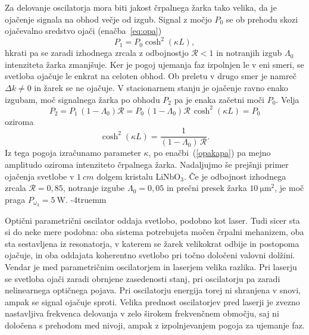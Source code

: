 Za delovanje oscilatorja mora biti jakost črpalnega žarka tako velika, da je 
ojačenje signala na obhod večje od izgub. Signal z močjo 
$P_0$ se ob prehodu skozi ojačevalno sredstvo ojači (enačba~\ref{eq:opa})
\begin{equation}
P_1 = P_0 \cosh^2 (\kappa L),
\end{equation}
hkrati pa se zaradi izhodnega zrcala z odbojnostjo $\mathcal{R}<1$ in notranjih izgub $\Lambda_0$ 
intenziteta žarka zmanjšuje. Ker je pogoj ujemanja faz izpolnjen le v eni smeri, se svetloba
ojačuje le enkrat na celoten obhod. Ob preletu v drugo smer je namreč $\Delta k \neq 0$ in 
žarek se ne ojačuje. V stacionarnem stanju je ojačenje ravno enako izgubam, moč 
signalnega žarka po obhodu $P_2$ pa je enaka začetni moči $P_0$. Velja
\begin{equation}
P_2 = P_1\,(1-\Lambda_0)\mathcal{R} = P_0 \,(1-\Lambda_0) \mathcal{R} \,\cosh^2 (\kappa L) = P_0
\end{equation}
oziroma
\begin{equation}
\cosh^2 (\kappa L) =\frac{1}{(1-\Lambda_0)\, \mathcal{R}}.
\end{equation}
Iz tega pogoja izračunamo parameter $\kappa$, po enačbi~(\ref{opakapa}) pa mejno 
amplitudo oziroma intenziteto črpalnega žarka. Nadaljujmo še prejšnji primer ojačenja 
svetlobe v $1~\si{cm}$ dolgem kristalu LiNbO$_{3}$.
Če je odbojnost izhodnega zrcala $\mathcal{R}=0,85$, notranje izgube $\Lambda_0 = 0,05$ in prečni presek 
žarka $10~\si{\micro\metre^2}$, je moč praga $P_{\omega_3} = 5~\si{\watt}$.
\vglue-4truemm
\begin{remark}
Optični parametrični oscilator oddaja svetlobo, podobno kot laser. Tudi sicer
sta si do neke mere podobna: oba sistema potrebujeta močen črpalni mehanizem, oba 
sta sestavljena iz resonatorja, v katerem se žarek velikokrat odbije in postopoma ojačuje,
in oba oddajata koherentno svetlobo pri točno določeni valovni dolžini. Vendar
je med parametričnim oscilatorjem in laserjem velika razlika. Pri laserju se svetloba
ojači zaradi obrnjene zasedenosti stanj, pri oscilatorju pa 
zaradi nelinearnega optičnega pojava. Pri oscilatorju energija torej ni shranjena v
snovi, ampak se signal ojačuje sproti. Velika prednost oscilatorjev pred laserji 
je zvezno nastavljiva frekvenca delovanja v zelo širokem frekvenčnem območju, saj ni določena
s prehodom med nivoji, ampak z izpolnjevanjem pogoja za ujemanje faz.
\end{remark}

